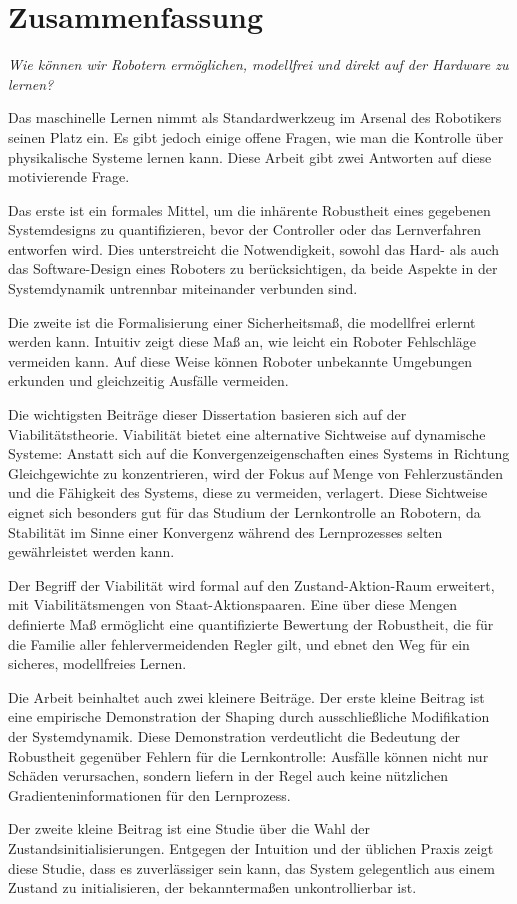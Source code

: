 
\chapter*{Zusammenfassung}
\emph{Wie können wir Robotern ermöglichen, modellfrei und direkt auf der Hardware zu lernen?} \par

Das maschinelle Lernen nimmt als Standardwerkzeug im Arsenal des Robotikers seinen Platz ein. Es gibt jedoch einige offene Fragen, wie man die Kontrolle über physikalische Systeme lernen kann. Diese Arbeit gibt zwei Antworten auf diese motivierende Frage. \par
Das erste ist ein formales Mittel, um die inhärente Robustheit eines gegebenen Systemdesigns zu quantifizieren, bevor der Controller oder das Lernverfahren entworfen wird. Dies unterstreicht die Notwendigkeit, sowohl das Hard- als auch das Software-Design eines Roboters zu berücksichtigen, da beide Aspekte in der Systemdynamik untrennbar miteinander verbunden sind. \par
Die zweite ist die Formalisierung einer Sicherheitsmaß, die modellfrei erlernt werden kann. Intuitiv zeigt diese Maß an, wie leicht ein Roboter Fehlschläge vermeiden kann. Auf diese Weise können Roboter unbekannte Umgebungen erkunden und gleichzeitig Ausfälle vermeiden. \par
Die wichtigsten Beiträge dieser Dissertation basieren sich auf der Viabilitätstheorie. Viabilität bietet eine alternative Sichtweise auf dynamische Systeme: Anstatt sich auf die Konvergenzeigenschaften eines Systems in Richtung Gleichgewichte zu konzentrieren, wird der Fokus auf Menge von Fehlerzuständen und die Fähigkeit des Systems, diese zu vermeiden, verlagert. Diese Sichtweise eignet sich besonders gut für das Studium der Lernkontrolle an Robotern, da Stabilität im Sinne einer Konvergenz während des Lernprozesses selten gewährleistet werden kann. \par
Der Begriff der Viabilität wird formal auf den Zustand-Aktion-Raum erweitert, mit Viabilitätsmengen von Staat-Aktionspaaren. Eine über diese Mengen definierte Maß ermöglicht eine quantifizierte Bewertung der Robustheit, die für die Familie aller fehlervermeidenden Regler gilt, und ebnet den Weg für ein sicheres, modellfreies Lernen. \par
Die Arbeit beinhaltet auch zwei kleinere Beiträge. Der erste kleine Beitrag ist eine empirische Demonstration der Shaping durch ausschließliche Modifikation der Systemdynamik. Diese Demonstration verdeutlicht die Bedeutung der Robustheit gegenüber Fehlern für die Lernkontrolle: Ausfälle können nicht nur Schäden verursachen, sondern liefern in der Regel auch keine nützlichen Gradienteninformationen für den Lernprozess. \par
Der zweite kleine Beitrag ist eine Studie über die Wahl der Zustandsinitialisierungen. Entgegen der Intuition und der üblichen Praxis zeigt diese Studie, dass es zuverlässiger sein kann, das System gelegentlich aus einem Zustand zu initialisieren, der bekanntermaßen unkontrollierbar ist. 